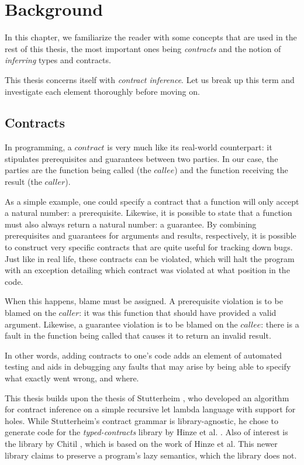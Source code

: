 \documentclass[10pt]{report}
\newcommand{\code}[1]{%
  {%
   \setlength{\fboxsep}{-2\fboxrule}%
   \fcolorbox{black}{light-gray}{\hspace{1.5pt}\strut\texttt{#1}\hspace{1.5pt}}%
  }%
}
\begin{document}
\chapter{Background}

In this chapter, we familiarize the reader with some concepts that are used in the rest of this thesis, the most important ones being \textit{contracts} and the notion of \textit{inferring} types and contracts.

This thesis concerns itself with \textit{contract inference}.
Let us break up this term and investigate each element thoroughly before moving on.

\section{Contracts}
In programming, a $contract$ is very much like its real-world counterpart: it stipulates prerequisites and guarantees between two parties.
In our case, the parties are the function being called (the $callee$) and the function receiving the result (the $caller$).

As a simple example, one could specify a contract that a function will only accept a natural number: a prerequisite.
Likewise, it is possible to state that a function must also always return a natural number: a guarantee.
By combining prerequisites and guarantees for arguments and results, respectively, it is possible to construct very specific contracts that are quite useful for tracking down bugs.
Just like in real life, these contracts can be violated, which will halt the program with an exception detailing which contract was violated at what position in the code.

When this happens, blame must be assigned.
A prerequisite violation is to be blamed on the $caller$: it was this function that should have provided a valid argument.
Likewise, a guarantee violation is to be blamed on the $callee$: there is a fault in the function being called that causes it to return an invalid result.

In other words, adding contracts to one's code adds an element of automated testing and aids in debugging any faults that may arise by being able to specify what exactly went wrong, and where.

This thesis builds upon the thesis of Stutterheim \cite{Stutterheim:2013:thesis}, who developed an algorithm for contract inference on a simple recursive let lambda language with support for holes.
While Stutterheim's contract grammar is library-agnostic, he chose to generate code for the \textit{typed-contracts} library by Hinze et al. \cite{Hinze06typedcontracts}. 
Also of interest is the library by Chitil \cite{Chitil:2012ua}, which is based on the work of Hinze et al.
This newer library claims to preserve a program's lazy semantics, which the \code{typed-contracts} library does not.
\end{document}
